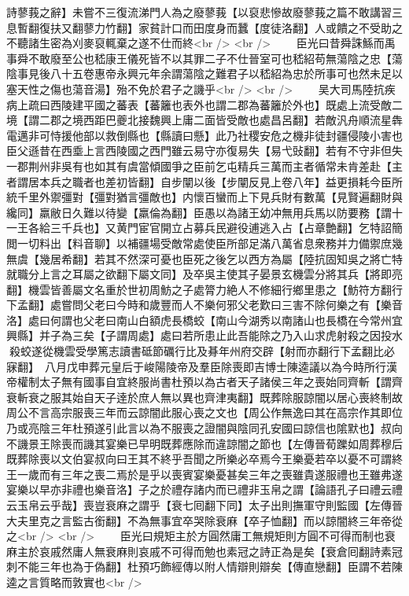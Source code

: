 詩蓼莪之辭】未嘗不三復流涕門人為之廢蓼莪【以裒悲慘故廢蓼莪之篇不敢講習三息暫翻復扶又翻蓼力竹翻】家貧計口而田度身而蠶【度徒洛翻】人或饋之不受助之不聽諸生密為刈麥裒輒棄之遂不仕而終<br />
<br />
　　臣光曰昔舜誅鯀而禹事舜不敢廢至公也嵇康王儀死皆不以其罪二子不仕晉室可也嵇紹苟無蕩陰之忠【蕩陰事見後八十五卷惠帝永興元年余謂蕩陰之難君子以嵇紹為忠於所事可也然未足以塞天性之傷也蕩音湯】殆不免於君子之譏乎<br />
<br />
　　吴大司馬陸抗疾病上疏曰西陵建平國之蕃表【蕃籬也表外也謂二郡為蕃籬於外也】既處上流受敵二境【謂二郡之境西距巴夔北接魏興上庸二面皆受敵也處昌呂翻】若敵汎舟順流星犇電邁非可恃援他部以救倒縣也【縣讀曰懸】此乃社稷安危之機非徒封疆侵陵小害也臣父遜昔在西埀上言西陵國之西門雖云易守亦復易失【易弋䜴翻】若有不守非但失一郡荆州非吳有也如其有虞當傾國爭之臣前乞屯精兵三萬而主者循常未肯差赴【主者謂居本兵之職者也差初皆翻】自步闡以後【步闡反見上卷八年】益更損耗今臣所統千里外禦彊對【彊對猶言彊敵也】内懷百蠻而上下見兵財有數萬【見賢遍翻財與纔同】羸敝日久難以待變【羸倫為翻】臣愚以為諸王幼冲無用兵馬以防要務【謂十一王各給三千兵也】又黄門宦官開立占募兵民避役逋逃入占【占章艶翻】乞特詔簡閲一切料出【料音聊】以補疆場受敵常處使臣所部足滿八萬省息衆務并力備禦庶幾無虞【幾居希翻】若其不然深可憂也臣死之後乞以西方為屬【陸抗固知吳之將亡特就職分上言之耳屬之欲翻下屬文同】及卒吳主使其子晏景玄機雲分將其兵【將即亮翻】機雲皆善屬文名重於世初周魴之子處膂力絶人不修細行鄉里患之【魴符方翻行下孟翻】處嘗問父老曰今時和歲豐而人不樂何邪父老歎曰三害不除何樂之有【樂音洛】處曰何謂也父老曰南山白額虎長橋蛟【南山今湖秀以南諸山也長橋在今常州宜興縣】并子為三矣【子謂周處】處曰若所患止此吾能除之乃入山求虎射殺之因投水殺蛟遂從機雲受學篤志讀書砥節礪行比及朞年州府交辟【射而亦翻行下孟翻比必寐翻】　八月戊申葬元皇后于峻陽陵帝及羣臣除喪即吉博士陳逵議以為今時所行漢帝權制太子無有國事自宜終服尚書杜預以為古者天子諸侯三年之喪始同齊斬【謂齊衰斬衰之服其始自天子逹於庶人無以異也齊津夷翻】既葬除服諒闇以居心喪終制故周公不言高宗服喪三年而云諒闇此服心喪之文也【周公作無逸曰其在高宗作其即位乃或亮陰三年杜預遂引此言以為不服喪之證闇與陰同孔安國曰諒信也隂默也】叔向不譏景王除喪而譏其宴樂已早明既葬應除而違諒闇之節也【左傳晉荀躒如周葬穆后既葬除喪以文伯宴叔向曰王其不終乎吾聞之所樂必卒焉今王樂憂若卒以憂不可謂終王一歲而有三年之喪二焉於是乎以喪賓宴樂憂甚矣三年之喪雖貴遂服禮也王雖弗遂宴樂以早亦非禮也樂音洛】子之於禮存諸内而已禮非玉帛之謂【論語孔子曰禮云禮云玉帛云乎哉】喪豈衰麻之謂乎【衰七囘翻下同】太子出則撫軍守則監國【左傳晉大夫里克之言監古銜翻】不為無事宜卒哭除衰麻【卒子恤翻】而以諒闇終三年帝從之<br />
<br />
　　臣光曰規矩主於方圓然庸工無規矩則方圓不可得而制也衰麻主於哀戚然庸人無衰麻則哀戚不可得而勉也素冠之詩正為是矣【衰倉囘翻詩素冠刺不能三年也為于偽翻】杜預巧飾經傳以附人情辯則辯矣【傳直戀翻】臣謂不若陳逵之言質略而敦實也<br />
